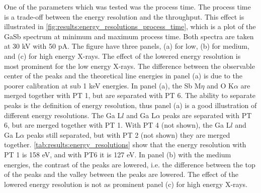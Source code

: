 One of the parameters which was tested was the process time.
The process time is a trade-off between the energy resolution and the throughput.
This effect is illustrated in \cref{fig:results:energy_resolutions_process_time}, which is a plot of the GaSb spectrum at minimum and maximum process time.
Both spectra are taken at 30 kV with 50 pA.
The figure have three panels, (a) for low, (b) for medium, and (c) for high energy X-rays.
The effect of the lowered energy resolution is most prominent for the low energy X-rays.
The difference between the observable center of the peaks and the theoretical line energies in panel (a) is due to the poorer calibration at sub 1 keV energies.
In panel (a), the Sb M$\eta$ and O K$\alpha$ are merged together with PT 1, but are separated with PT 6.
The ability to separate peaks is the definition of energy resolution, thus panel (a) is a good illustration of different energy resolutions.
The Ga L$l$ and Ga L$\alpha$ peaks are separated with PT 6, but are merged together with PT 1.
With PT 4 (not shown), the Ga L$l$ and Ga L$\alpha$ peaks still separated, but with PT 2 (not shown) they are merged together.
\cref{tab:results:energy_resolutions} show that the energy resolution with PT 1 is 158 eV, and with PT6 it is 127 eV.
In panel (b) with the medium energies, the contrast of the peaks are lowered, i.e. the difference between the top of the peaks and the valley between the peaks are lowered.
The effect of the lowered energy resolution is not as prominent panel (c) for high energy X-rays.



